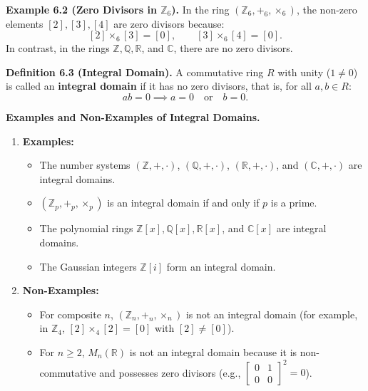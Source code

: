 \documentclass[11pt,a4paper]{article}
\begin{document}
\begin{exbox}
\textbf{Example 6.2 (Zero Divisors in $\mathbb{Z}_6$).} In the ring $(\mathbb{Z}_6, +_6, \times_6)$, the non-zero elements $[2], [3], [4]$ are zero divisors because:
\[
[2] \times_6 [3] = [0], \qquad [3] \times_6 [4] = [0].
\]
In contrast, in the rings $\mathbb{Z}, \mathbb{Q}, \mathbb{R}$, and $\mathbb{C}$, there are no zero divisors.
\end{exbox}

\begin{defbox}
\textbf{Definition 6.3 (Integral Domain).} A commutative ring $R$ with unity ($1 \ne 0$) is called an \textbf{integral domain} if it has no zero divisors, that is, for all $a, b \in R$:
\[
ab = 0 \implies a = 0 \quad \text{or} \quad b = 0.
\]
\end{defbox}

\begin{exbox}
\textbf{Examples and Non-Examples of Integral Domains.}
\begin{enumerate}[label=\textbf{\arabic*)}]
    \item \textbf{Examples:}
    \begin{itemize}
        \item The number systems $(\mathbb{Z}, +, \cdot)$, $(\mathbb{Q}, +, \cdot)$, $(\mathbb{R}, +, \cdot)$, and $(\mathbb{C}, +, \cdot)$ are integral domains.
        \item $(\mathbb{Z}_p, +_p, \times_p)$ is an integral domain if and only if $p$ is a prime.
        \item The polynomial rings $\mathbb{Z}[x], \mathbb{Q}[x], \mathbb{R}[x]$, and $\mathbb{C}[x]$ are integral domains.
        \item The Gaussian integers $\mathbb{Z}[i]$ form an integral domain.
    \end{itemize}
    \item \textbf{Non-Examples:}
    \begin{itemize}
        \item For composite $n$, $(\mathbb{Z}_n, +_n, \times_n)$ is not an integral domain (for example, in $\mathbb{Z}_4$, $[2] \times_4 [2] = [0]$ with $[2] \ne [0]$).
        \item For $n \ge 2$, $M_n(\mathbb{R})$ is not an integral domain because it is non-commutative and possesses zero divisors (e.g., $\begin{bmatrix} 0 & 1 \\ 0 & 0 \end{bmatrix}^2 = 0$).
    \end{itemize}
\end{enumerate}
\end{exbox}
\end{document}
